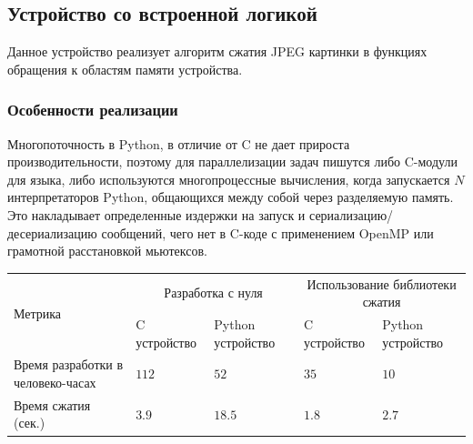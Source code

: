 %    

\subsection{Устройство со встроенной логикой}\label{sec:ch3/sec2/sec1}

Данное устройство реализует алгоритм сжатия JPEG картинки в функциях обращения
к областям памяти устройства.

\subsubsection{Особенности реализации}\label{sec:ch3/sec2/sec1/sec1}

Многопоточность в Python, в отличие от C не дает прироста производительности,
поэтому для параллелизации задач пишутся либо C-модули для языка, либо используются
многопроцессные вычисления, когда запускается $N$ интерпретаторов Python, общающихся
между собой через разделяемую память. Это накладывает определенные издержки на запуск
и сериализацию/десериализацию сообщений, чего нет в C-коде с применением OpenMP или
грамотной расстановкой мьютексов.

\begin{longtable}{| p{3cm} | p{3cm} | p{3cm} | p{3cm} | p{3cm} |}
    \hline
        \multirow{2}{*}{Метрика} &
        \multicolumn{2}{c|}{Разработка с нуля} &
        \multicolumn{2}{c|}{Использование библиотеки сжатия} \\
    \cline{2-5} &
        C устройство &
        Python устройство &
        C устройство &
        Python устройство \\
    \hline
        Время разработки в человеко-часах &
        $112$ &
        $52$ &
        $35$ &
        $10$ \\
    \hline
        Время сжатия (сек.)&
        $3.9$   &
        $18.5$  &
        $1.8$   &
        $2.7$   \\
    \hline
\end{longtable}

